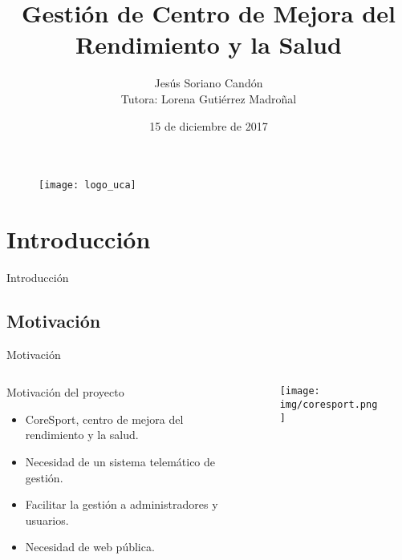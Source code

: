 \documentclass[spanish,xcolor=table,svgnames]{beamer}
\title[Gestión de Centro de Mejora del Rendimiento y la Salud]{Gestión de Centro de Mejora del\\Rendimiento y la Salud}
\author[Jesús Soriano Candón]{Jesús Soriano Candón\\Tutora: Lorena Gutiérrez Madroñal}
\institute[UCA]{Ingenierí­a Informática}
\date{15 de diciembre de 2017}
\begin{document}
\begin{frame}
\vspace*{-3mm}
  \titlepage
  \vspace*{-4mm}
  \begin{figure}
	\texttt{[image: logo\_uca]} 
  \end{figure}
\end{frame}


\section{Introducción}
\begin{frame}{Introducción}
    \tableofcontents[currentsection]
\end{frame}

\subsection*{Motivación}
\begin{frame}{Motivación}
  \begin{columns}[onlytextwidth]
    \begin{column}{0.5\textwidth}
      \begin{block}{Motivación del proyecto}
        \begin{itemize}
          \item CoreSport, centro de mejora del rendimiento y la salud.
          \item Necesidad de un sistema telemático de gestión.
          \item Facilitar la gestión a administradores y usuarios.
          \item Necesidad de web pública.
        \end{itemize}
      \end{block}
    \end{column}
    \begin{column}{0.5\textwidth}
      \centering
      \begin{figure}[H]
        \begin{center}
        \texttt{[image: img/coresport.png]}
        \end{center}
        \label{fig:logo-coresport}
      \end{figure}
    \end{column}
  \end{columns}
\end{frame}
\end{document}
